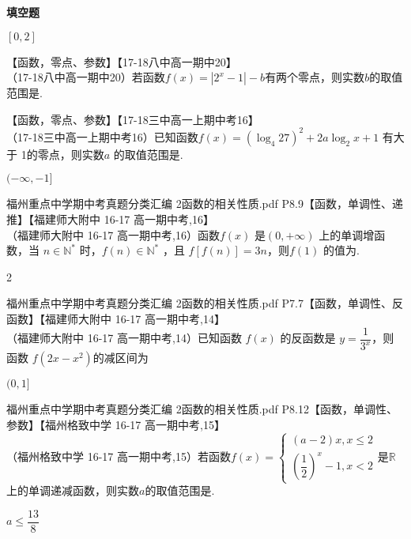 \begin{exercise}{\bf 填空题}
\begin{answer}
        $[0,2]$
      \end{answer}
    \item 【函数，零点、参数】【17-18八中高一期中20】\\
      （17-18八中高一期中20）若函数$f(x)=|2^x-1|-b $有两个零点，则实数$b$的取值范围是\tk.
    \item 【函数，零点、参数】【17-18三中高一上期中考16】\\
      （17-18三中高一上期中考16）已知函数$f(x)=(\log_4 27)^2+2a\log_2x+1 $ 有大于 1的零点，则实数$a$ 的取值范围是\tk.
      \begin{answer}
        $(-\infty,-1]$
      \end{answer}
    \item 福州重点中学期中考真题分类汇编 2函数的相关性质.pdf P8.9【函数，单调性、递推】【福建师大附中 16-17 高一期中考,16】\\
      （福建师大附中 16-17 高一期中考,16）函数$f(x)$ 是$(0,+\infty)$ 上的单调增函数，当 $n\in \mathbb{N}^*$ 时，$f(n)\in\mathbb{N}^*$ ，且 $f[f(n) ] =3n$，则$f(1)$ 的值为\tk.
      \begin{answer}2\end{answer}
    \item 福州重点中学期中考真题分类汇编 2函数的相关性质.pdf P7.7【函数，单调性、反函数】【福建师大附中 16-17 高一期中考,14】\\
     （福建师大附中 16-17 高一期中考,14）已知函数 $f(x)$ 的反函数是 $y=\dfrac{1}{3^x}$，则函数 $f(2x-x^2) $的减区间为\tk
     \begin{answer}
       $(0,1]$
     \end{answer}
    \item 福州重点中学期中考真题分类汇编 2函数的相关性质.pdf P8.12【函数，单调性、参数】【福州格致中学 16-17 高一期中考,15】\\
     （福州格致中学 16-17 高一期中考,15）若函数$f(x)=\begin{cases}(a-2)x,x\leq2\\(\dfrac{1}{2})^x-1,x<2\end{cases}$是$\mathbb{R}$上的单调递减函数，则实数$a$的取值范围是\tk.
     \begin{answer}
       $a\leq\dfrac{13}{8}$
     \end{answer}
  \end{exercise}
